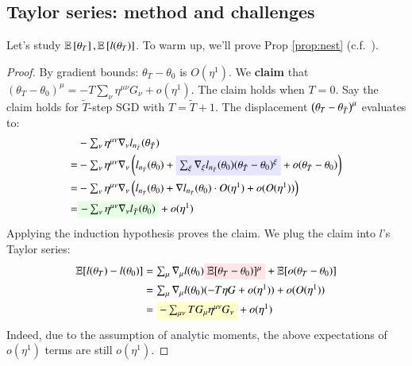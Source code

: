 \subsection{Taylor series: method and challenges}\label{sect:challenges}
    Let's study $\mathbb{E}\left[\theta_T\right], \mathbb{E}\left[l(\theta_T)\right]$.  To warm
    up, we'll prove Prop \ref{prop:nest} (c.f.\ \cite{ne04,ro18}). 
    \begin{proof} %
        By gradient bounds: $\theta_T - \theta_0$ is $O(\eta^1)$.
        We \textbf{claim} that $(\theta_T - \theta_0)^\mu =
        -T\sum_\nu \eta^{\mu\nu}G_\nu + o(\eta^1)$.
        The claim holds when $T=0$.  Say the claim holds for
        ${\tilde T}$-step SGD with
        $T = {\tilde T}+1$.  The displacement
        $\left(\theta_{T} - \theta_{{\tilde T}}\right)^\mu$
        evaluates to:
        \begin{align*}
               & - \textstyle\sum_{\nu} \eta^{\mu\nu} \nabla_\nu l_{n_{\tilde T}}(\theta_{{\tilde T}})   
            \\=& - \textstyle\sum_{\nu} \eta^{\mu\nu} \nabla_\nu \wrap{
                       l_{n_{\tilde T}}(\theta_0)
                       + \text{\translucent{moosky}{$\sum_{\xi} \nabla_\xi l_{n_{\tilde T}}(\theta_0) (\theta_{{\tilde T}} - \theta_0)^\xi$}}
                       + o(\theta_{{\tilde T}} - \theta_0)
                   }    
            \\=& - \textstyle\sum_{\nu} \eta^{\mu\nu} \nabla_\nu \wrap{
                          l_{n_{\tilde T}}(\theta_0)
                          + \nabla l_{n_{\tilde T}}(\theta_0) \cdot O(\eta^1) + o(O(\eta^1))
                      }    
            \\=& \textstyle\text{\translucent{moolime}{$- \sum_\nu \eta^{\mu\nu} \nabla_\nu l_{{\tilde T}}(\theta_0)$}} + o(\eta^1)
        \end{align*}
        Applying the induction hypothesis proves the claim.
        We plug the claim into $l$'s Taylor series:
        \begin{align*}
            \expc[l(\theta_T) - l(\theta_0)]
            &= \textstyle \sum_\mu \nabla_\mu l(\theta_0) \text{\translucent{moopink}{$\expc[\theta_T - \theta_0)]^\mu$}} + \expc[o(\theta_T - \theta_0)] \\
            &= \textstyle \sum_\mu \nabla_\mu l(\theta_0) (-T\eta G + o(\eta^1)) + o(O(\eta^1)) \\
            &= \textstyle \text{\translucent{moogold}{$- \sum_{\mu\nu} T G_\mu \eta^{\mu\nu} G_\nu$}}+ o(\eta^1)
        \end{align*}
        Indeed, due to the assumption of analytic moments, the above
        expectations of $o(\eta^1)$ terms are still $o(\eta^1)$.
    \end{proof}

